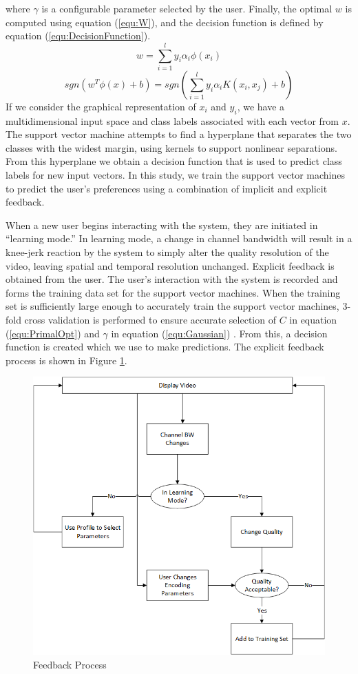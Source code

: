 \documentclass[preprint, 12pt]{elsarticle}
\begin{document}
where $\gamma$ is a configurable parameter selected by the user. Finally, the optimal $w$ is computed using equation (\ref{equ:W}), and the decision function is defined by equation (\ref{equ:DecisionFunction}).
\begin{equation}
\label{equ:W}
w = \sum_{i=1}^{l} y_i \alpha_i \phi (x_i)
\end{equation}
\begin{equation}
\label{equ:DecisionFunction}
sgn(w^T\phi (x) + b) = sgn(\sum_{i=1}^{l} y_i\alpha_i K(x_i, x_j) +b)
\end{equation}
If we consider the graphical representation of $x_i$ and $y_i$, we have a multidimensional input space and class labels associated with each vector from $x$. The support vector machine attempts to find a hyperplane that separates the two classes with the widest margin, using kernels to support nonlinear separations. From this hyperplane we obtain a decision function that is used to predict class labels for new input vectors. In this study, we train the support vector machines to predict the user’s preferences using a combination of implicit and explicit feedback. 

When a new user begins interacting with the system, they are initiated in ``learning mode.'' In learning mode, a change in channel bandwidth will result in a knee-jerk reaction by the system to simply alter the quality resolution of the video, leaving spatial and temporal resolution unchanged. Explicit feedback is obtained from the user. The user's interaction with the system is recorded and forms the training data set for the support vector machines. When the training set is sufficiently large enough to accurately train the support vector machines, 3-fold cross validation is performed to ensure accurate selection of $C$ in equation (\ref{equ:PrimalOpt}) and $\gamma$ in equation (\ref{equ:Gaussian}) \cite{LibSVM}. From this, a decision function is created which we use to make predictions. The explicit feedback process is shown in Figure \ref{fig:Feedback}.
\begin{figure}[h]
\centering
\includegraphics[width=0.5\linewidth]{BandwidthChangeDecisionTree.png}
\caption{Feedback Process}
\label{fig:Feedback}
\end{figure}
\end{document}
